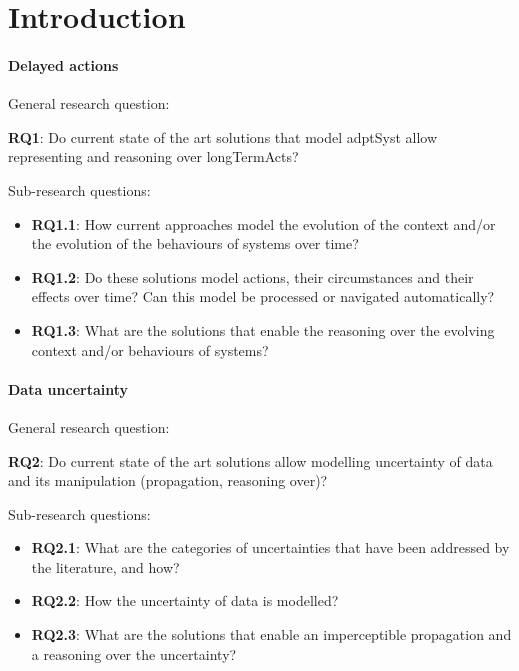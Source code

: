 \section{Introduction}

\paragraph{Delayed actions}
General research question:
\begin{center}
	\textbf{RQ1}: Do current state of the art solutions that model \gls{adptSyst} allow representing and reasoning over \glspl{longTermAct}?  
\end{center}

Sub-research questions:
\begin{itemize}
	\item \textbf{RQ1.1}: How current approaches model the evolution of the context and/or the evolution of the behaviours of systems over time?
	\item \textbf{RQ1.2}: Do these solutions model actions, their circumstances and their effects over time? Can this model be processed or navigated automatically?
	\item \textbf{RQ1.3}: What are the solutions that enable the reasoning over the evolving context and/or behaviours of systems?
\end{itemize}


\paragraph{Data uncertainty}
General research question:
\begin{center}
	\textbf{RQ2}: Do current state of the art solutions allow modelling uncertainty of data and its manipulation (propagation, reasoning over)? 
\end{center}

Sub-research questions:
\begin{itemize}
	\item \textbf{RQ2.1}: What are the categories of uncertainties that have been addressed by the literature, and how?
	\item \textbf{RQ2.2}: How the uncertainty of data is modelled?
	\item \textbf{RQ2.3}: What are the solutions that enable an imperceptible propagation and a reasoning over the uncertainty?
\end{itemize}

